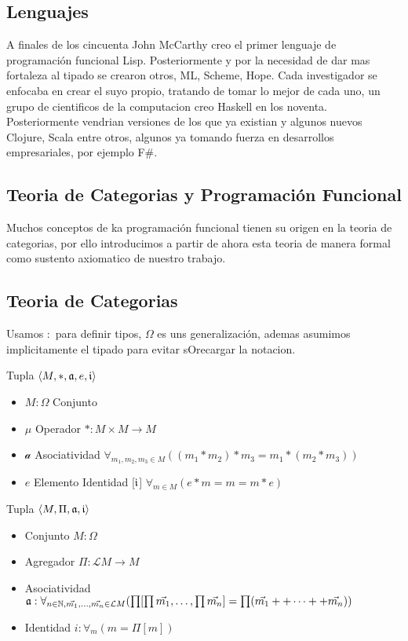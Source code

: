 \subsection{Lenguajes}

A finales de los cincuenta John McCarthy creo el primer lenguaje de programación funcional Lisp. Posteriormente y por la necesidad de dar mas fortaleza al tipado se crearon otros, ML, Scheme, Hope. Cada investigador se enfocaba en crear el suyo propio, tratando de tomar lo mejor de cada uno, un grupo de cientificos de la computacion creo Haskell en los noventa. Posteriormente vendrian versiones de los que ya existian y algunos nuevos Clojure, Scala entre otros, algunos ya tomando fuerza en desarrollos empresariales, por ejemplo F\#.

\subsection{Teoria de Categorias y Programación Funcional}

Muchos conceptos de ka programación funcional tienen su origen en la teoria de categorias, por ello introducimos a partir de ahora esta teoria de manera formal como sustento axiomatico de nuestro trabajo.

\subsection{Teoria de Categorias}

\begin{note}
Usamos $:$ para definir tipos,  $\Omega$ es uns generalización, ademas asumimos implicitamente el tipado para evitar sOrecargar la notacion.
\end{note}

\begin{defn}[Monoide]
\end{defn}
Tupla $\langle M, *, \mathfrak{a}, e, \mathfrak{i} \rangle$ 
\begin{itemize}
\item $M: \Omega$ Conjunto
\item $\mu$ Operador $* : M \times M \to M$
\item $\mathcal{a}$ Asociatividad $\forall_{m_1, m_2, m_3 \in M} ((m_1 * m_2) * m_3 = m_1 * (m_2 * m_3))$
\item $e$ Elemento Identidad [$\mathfrak{i}$] $\forall_{m \in M} ( e * m = m = m * e)$
\end{itemize}

\begin{defn}[Agregación]
\end{defn}
Tupla $\langle M, \Pi, \mathfrak{a}, \mathfrak{i} \rangle$  
\begin{itemize}
\item Conjunto $M: \Omega$ 
\item Agregador $\Pi: \mathcal{L} M \to M$
\item Asociatividad $\mathfrak{a}: \forall_{ n \in \mathbb{N}, \vec{m_1}, \dots, \vec{m_n} \in \mathcal{L}M}
(\prod [\prod \vec{m_1}, \dots , \prod \vec{m_n}] = \prod(\vec{m_1} ++ \dots ++ \vec{m_n}))$
\item Identidad $i: \forall_m ( m = \Pi[m])$
\end{itemize}

